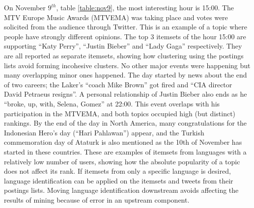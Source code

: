 \documentclass{sig-alternate}
\begin{document}
On November $9^{th}$, table \ref{table:nov9}, the most interesting hour is
15:00.
The MTV Europe Music Awards (MTVEMA) was taking place and votes were solicited
from the audience through Twitter.
This is an example of a topic where people have strongly different opinions.
The top 3 itemsets of the hour 15:00 are supporting ``Katy  Perry'',
``Justin Bieber'' and ``Lady Gaga'' respectively.
They are all reported as separate itemsets, showing how clustering using the
postings lists avoid forming incohesive clusters.
No other major events were happening but many overlapping minor ones happened.
The day started by news about the end of two careers;
the Laker's ``coach Mike Brown'' got fired  and ``CIA director David Petraeus
resigns''.
A personal relationship of Justin Bieber also ends as he
``broke, up, with, Selena, Gomez'' at 22:00.
This event overlaps with his participation in the MTVEMA,
and both topics occupied high (but distinct) rankings. 
By the end of the day in North America, many congratulations for the
Indonesian Hero's day (``Hari Pahlawan'') appear, and the Turkish
commemoration day of Ataturk is also mentioned as the 10th of November has
started in these countries.
These are examples of itemsets from languages with a relatively low number of
users, showing how the absolute popularity of a topic does not affect its rank.
If itemsets from only a specific language is desired,
language identification can be applied on the itemsets and tweets from their
postings lists.
Moving language identification downstream avoids affecting the results of
mining because of error in an upstream component.
\end{document}
